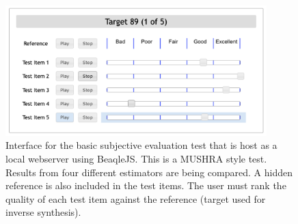\begin{figure}
    \centering
    \includegraphics[width=0.9\textwidth]{figures/spiegelib/beaqlejs_interface.png}
    \caption{Interface for the basic subjective evaluation test that is host as a local webserver using BeaqleJS. This is a MUSHRA style test. Results from four different estimators are being compared. A hidden reference is also included in the test items. The user must rank the quality of each test item against the reference (target used for inverse synthesis).}
    \label{fig:basic_subjective}
\end{figure}





